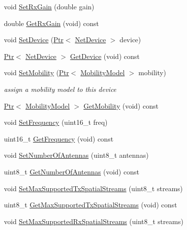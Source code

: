 \begin{DoxyCompactItemize}
\item 
void \hyperlink{classns3_1_1WifiPhy_ab6761e5e5169447422aff503bab4ee28}{Set\+Rx\+Gain} (double gain)
\item 
double \hyperlink{classns3_1_1WifiPhy_ac794a3605ed0524f4182d0b72bee9049}{Get\+Rx\+Gain} (void) const 
\item 
void \hyperlink{classns3_1_1WifiPhy_aef088ef57b4c5921ab8f009810fb9f13}{Set\+Device} (\hyperlink{classns3_1_1Ptr}{Ptr}$<$ \hyperlink{classns3_1_1NetDevice}{Net\+Device} $>$ device)
\item 
\hyperlink{classns3_1_1Ptr}{Ptr}$<$ \hyperlink{classns3_1_1NetDevice}{Net\+Device} $>$ \hyperlink{classns3_1_1WifiPhy_aa1eaf9515fb2d3a0578514e505f39364}{Get\+Device} (void) const 
\item 
void \hyperlink{classns3_1_1WifiPhy_a5bbd6f88cf0a8ac6c7437b278a17a582}{Set\+Mobility} (\hyperlink{classns3_1_1Ptr}{Ptr}$<$ \hyperlink{classns3_1_1MobilityModel}{Mobility\+Model} $>$ mobility)
\begin{DoxyCompactList}\small\item\em assign a mobility model to this device \end{DoxyCompactList}\item 
\hyperlink{classns3_1_1Ptr}{Ptr}$<$ \hyperlink{classns3_1_1MobilityModel}{Mobility\+Model} $>$ \hyperlink{classns3_1_1WifiPhy_abc912611b5b88566239a85b885a05430}{Get\+Mobility} (void) const 
\item 
void \hyperlink{classns3_1_1WifiPhy_afecd69b20631e112aa863dbed4c4bd22}{Set\+Frequency} (uint16\+\_\+t freq)
\item 
uint16\+\_\+t \hyperlink{classns3_1_1WifiPhy_ad2508d94faf22d690d6b8b4367934fd1}{Get\+Frequency} (void) const 
\item 
void \hyperlink{classns3_1_1WifiPhy_a00b11fc081f04ec36bc814c50861e34f}{Set\+Number\+Of\+Antennas} (uint8\+\_\+t antennas)
\item 
uint8\+\_\+t \hyperlink{classns3_1_1WifiPhy_ae23367ac8e1424724f95df441e0cd278}{Get\+Number\+Of\+Antennas} (void) const 
\item 
void \hyperlink{classns3_1_1WifiPhy_a4c4529066f8b7aa72ba1c79e59e20ca3}{Set\+Max\+Supported\+Tx\+Spatial\+Streams} (uint8\+\_\+t streams)
\item 
uint8\+\_\+t \hyperlink{classns3_1_1WifiPhy_ab5e6bb95a75d0e6e7e666efd3c014fe4}{Get\+Max\+Supported\+Tx\+Spatial\+Streams} (void) const 
\item 
void \hyperlink{classns3_1_1WifiPhy_a1e4f1ade2676db0ef5b71b7e05c78194}{Set\+Max\+Supported\+Rx\+Spatial\+Streams} (uint8\+\_\+t streams)

\end{DoxyCompactItemize}
